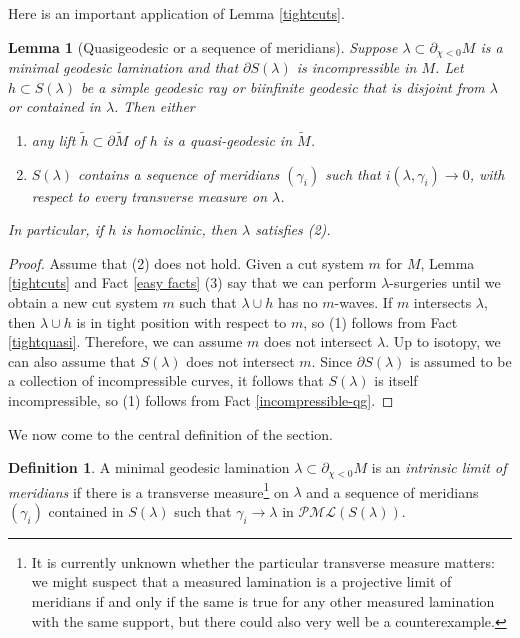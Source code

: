 \documentclass[12pt]{amsart}
\newtheorem{lemma}[theorem]{Lemma}
\theoremstyle{definition}
\newtheorem{definition}[theorem]{Definition}
\theoremstyle{remark}
\newcommand{\PML}{{\mathcal P \mathcal M \mathcal L}}
\begin{document}
 Here is an important application of Lemma \ref {tightcuts}. 

\begin{lemma}[Quasigeodesic or a sequence of meridians]\label {limitquasi}
 Suppose $\lambda \subset \partial_{\chi<0} M$ is a minimal geodesic lamination and that $\partial S(\lambda)$ is incompressible in $M$. Let  $h \subset S(\lambda)$  be a  simple geodesic ray or biinfinite geodesic that is disjoint from $\lambda$ or  contained in $\lambda$. Then either 
\begin{enumerate}
\item any lift $\tilde h \subset\partial \tilde M$ of $h$ is a quasi-geodesic in $\tilde M$.
\item $S(\lambda)$ contains a sequence of meridians $(\gamma_i)$ such that $i(\lambda,\gamma_i) \to 0$,  with respect to every transverse measure on $\lambda $. 
\end{enumerate}
In particular, if $h$ is homoclinic, then $\lambda$  satisfies (2).
\end{lemma}

\begin {proof}
Assume that (2) does not hold. Given a cut system $m$ for $M$, Lemma \ref{tightcuts} and Fact \ref{easy facts} (3) say that we can perform $\lambda $-surgeries until we obtain a new cut system $m$  such that $\lambda \cup h$  has no $m$-waves. If $m$ intersects $\lambda $, then $\lambda \cup h$  is in tight position with respect to $m$,   so (1) follows from Fact \ref{tightquasi}.   Therefore, we can assume $m$ does not intersect $\lambda $.  Up to isotopy,  we can also assume that $S(\lambda)$  does not intersect $m$. Since $\partial S(\lambda)$ is assumed to be a collection of incompressible curves, it follows that $S(\lambda)$ is itself incompressible, so (1) follows from Fact \ref{incompressible-qg}. \end {proof}


 We now come to the central definition of the section.

\begin {definition}
	A minimal geodesic lamination $\lambda \subset \partial_{\chi < 0} M$  is an \emph{intrinsic limit of meridians} if there is a transverse measure\footnote{It is currently unknown whether the particular  transverse measure  matters:  we  might suspect that a  measured lamination is a projective limit of meridians if and only if the same is true for any other measured lamination with the same support, but  there could also very well be a counterexample.} on $\lambda$ and a sequence of meridians $(\gamma_i)$ contained in $S(\lambda)$ such that $\gamma_i \to \lambda$ in $\PML(S (\lambda))$. 
\end {definition}
\end{document}
